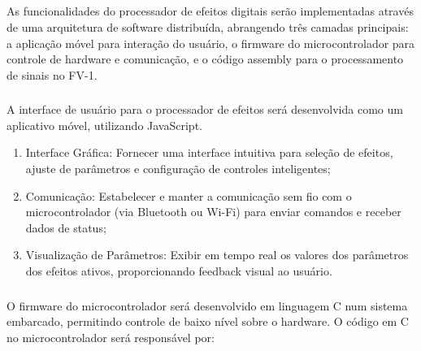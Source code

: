 \subsection{}

As funcionalidades do processador de efeitos digitais serão implementadas através de uma arquitetura de software distribuída, abrangendo três camadas principais: a aplicação móvel para interação do usuário, o firmware do microcontrolador para controle de hardware e comunicação, e o código assembly para o processamento de sinais no FV-1.

\subsubsection{}

A interface de usuário para o processador de efeitos será desenvolvida como um aplicativo móvel, utilizando JavaScript. 

\begin{enumerate}
    \item Interface Gráfica: Fornecer uma interface intuitiva para seleção de efeitos, ajuste de parâmetros e configuração de controles inteligentes;
    \item Comunicação: Estabelecer e manter a comunicação sem fio com o microcontrolador (via Bluetooth ou Wi-Fi) para enviar comandos e receber dados de status;
    \item Visualização de Parâmetros: Exibir em tempo real os valores dos parâmetros dos efeitos ativos, proporcionando feedback visual ao usuário.

\end{enumerate}

\subsubsection{}

O firmware do microcontrolador será desenvolvido em linguagem C num sistema embarcado, permitindo controle de baixo nível sobre o hardware. O código em C no microcontrolador será responsável por:

